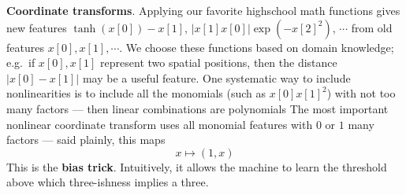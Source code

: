     \textbf{Coordinate transforms}.
      Applying our favorite highschool math functions gives new features
      $
          \tanh(x[0])-x[1],\, |x[1]x[0]| \exp(- x[2]^2),\, \cdots
      $
      from old features $x[0], x[1], \cdots$.
      We choose these functions based on
      domain knowledge; e.g.\ if $x[0], x[1]$ represent two spatial positions,
      then the distance $|x[0]-x[1]|$ may be a useful feature.
      One systematic way to include nonlinearities is to include all
      the monomials (such as $x[0] x[1]^2$) with not too many factors ---
      then linear combinations are polynomials
      The most important nonlinear coordinate transform uses all monomial
      features with $0$ or $1$ many factors --- said plainly, this maps
      $$
        x \mapsto (1, x)
      $$
      This
      is the \textbf{bias trick}.  Intuitively, it allows the machine to learn
      the threshold above which three-ishness implies a three.
  \begin{marginfigure}[-4cm]
    \centering
    \caption{%
        \textbf{The bias trick helps us model `offset' decision boundaries.}
        Here, the origin is the lower right corner closer to the camera.  Our
        raw inputs $x=(x[0],x[1])$ are $2$-dimensional; we can imagine them sitting on the
        bottom face of the plot (bottom ends of the vertical stems).  But,
        within that face, no line through the origin separates the data well.
        By contrast, when we use a featurization $(1,x[0],x[1])$,
        our data lies on the top face of the plot; now
        a plane through the origin (shown) successfully separates the data.
    }
  \end{marginfigure}
  \begin{marginfigure}
  \end{marginfigure}




